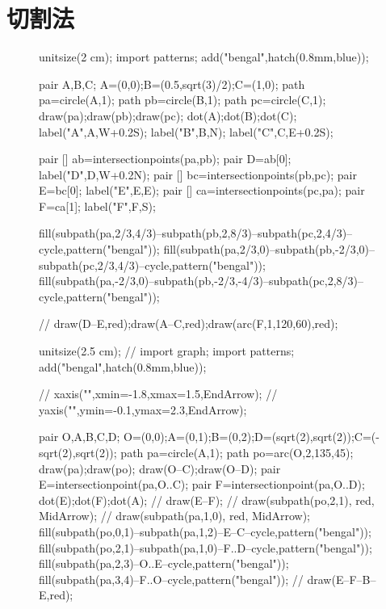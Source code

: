 \documentclass[12pt,space]{ctexart} %
\begin{document}


\section{切割法}
\begin{figure}[ht]
	\centering
	\begin{minipage}[b]{0.45\textwidth}
		\begin{asy}
			unitsize(2 cm);
			import patterns;
			add("bengal",hatch(0.8mm,blue));

			pair A,B,C;
			A=(0,0);B=(0.5,sqrt(3)/2);C=(1,0);
			path pa=circle(A,1);
			path pb=circle(B,1);
			path pc=circle(C,1);
			draw(pa);draw(pb);draw(pc);
			dot(A);dot(B);dot(C);
			label("A",A,W+0.2S);
			label("B",B,N);
			label("C",C,E+0.2S);

			pair [] ab=intersectionpoints(pa,pb);
			pair D=ab[0];
			label("D",D,W+0.2N);
			pair [] bc=intersectionpoints(pb,pc);
			pair E=bc[0];
			label("E",E,E);
			pair [] ca=intersectionpoints(pc,pa);
			pair F=ca[1];
			label("F",F,S);

			fill(subpath(pa,2/3,4/3)--subpath(pb,2,8/3)--subpath(pc,2,4/3)--cycle,pattern("bengal"));
			fill(subpath(pa,2/3,0)--subpath(pb,-2/3,0)--subpath(pc,2/3,4/3)--cycle,pattern("bengal"));
			fill(subpath(pa,-2/3,0)--subpath(pb,-2/3,-4/3)--subpath(pc,2,8/3)--cycle,pattern("bengal"));

			// draw(D--E,red);draw(A--C,red);draw(arc(F,1,120,60),red);
		\end{asy}
	\end{minipage}
	\qquad
	\begin{minipage}[b]{0.45\textwidth}
		\begin{asy}
			unitsize(2.5 cm);
			// import graph;
			import patterns;
			add("bengal",hatch(0.8mm,blue));

			// xaxis("",xmin=-1.8,xmax=1.5,EndArrow);
			// yaxis("",ymin=-0.1,ymax=2.3,EndArrow);

			pair O,A,B,C,D;
			O=(0,0);A=(0,1);B=(0,2);D=(sqrt(2),sqrt(2));C=(-sqrt(2),sqrt(2));
			path pa=circle(A,1);
			path po=arc(O,2,135,45);
			draw(pa);draw(po);
			draw(O--C);draw(O--D);
			pair E=intersectionpoint(pa,O..C);
			pair F=intersectionpoint(pa,O..D);
			dot(E);dot(F);dot(A);
			// draw(E--F);
			// draw(subpath(po,2,1), red, MidArrow);
			// draw(subpath(pa,1,0), red, MidArrow);
			fill(subpath(po,0,1)--subpath(pa,1,2)--E--C--cycle,pattern("bengal"));
			fill(subpath(po,2,1)--subpath(pa,1,0)--F..D--cycle,pattern("bengal"));
			fill(subpath(pa,2,3)--O..E--cycle,pattern("bengal"));
			fill(subpath(pa,3,4)--F..O--cycle,pattern("bengal"));
			// draw(E--F--B--E,red);
		\end{asy}
	\end{minipage}
\end{figure}
\vspace{1cm}
\end{document}

